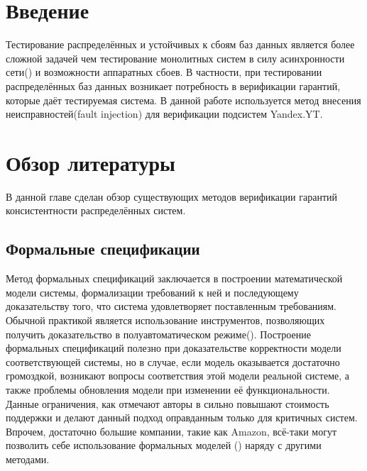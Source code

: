 \documentclass[pdftex,ptm,14pt,a4paper]{extreport}
\theoremstyle{definition}
\begin{document}
\tableofcontents

\sloppy

\chapter{Введение}
Тестирование распределённых и устойчивых к сбоям баз данных является более сложной задачей чем тестирование монолитных систем
в силу асинхронности сети(\cite{network-reliable}) и возможности аппаратных сбоев.
В частности, при тестировании распределённых баз данных возникает потребность в верификации гарантий, которые даёт тестируемая система.
В данной работе используется метод внесения неисправностей(fault injection) для верификации подсистем Yandex.YT.

\chapter{Обзор литературы}
В данной главе сделан обзор существующих методов
верификации гарантий консистентности распределённых систем.

\section{Формальные спецификации}
Метод формальных спецификаций заключается в построении математической модели системы, формализации требований к ней и последующему
доказательству того, что система удовлетворяет поставленным требованиям. Обычной практикой является использование инструментов, позволяющих получить доказательство в полуавтоматическом режиме(\cite{coq}).
Построение формальных спецификаций полезно при доказательстве корректности модели соответствующей
системы, но  в случае, если модель оказывается достаточно громоздкой, возникают вопросы
соответствия этой модели реальной системе, а также проблемы обновления модели при изменении её функциональности.
Данные ограничения, как отмечают авторы в \cite{models-bounds} сильно повышают стоимость поддержки
и делают данный подход оправданным только для критичных систем.
Впрочем, достаточно большие компании, такие как Amazon, всё-таки могут позволить себе использование формальных моделей
(\cite{amazon-formal-proofs}) наряду с другими методами.
\end{document}
